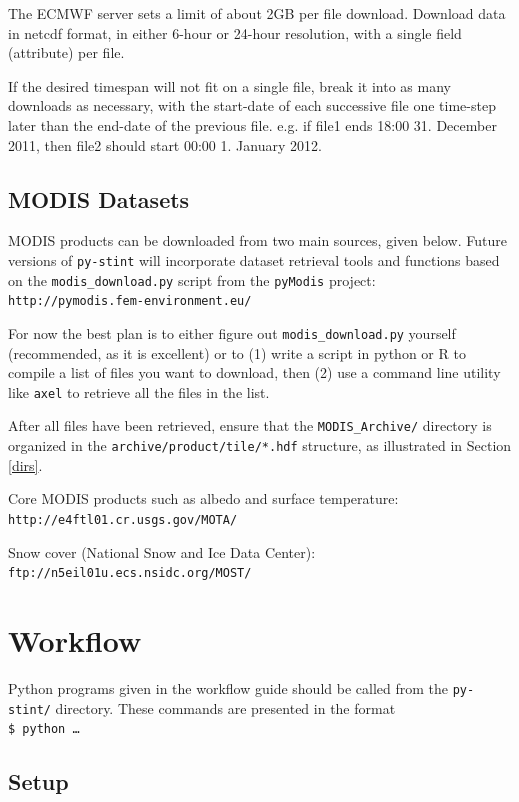 \documentclass[twoside,a4paper]{refart}
\begin{document}
\attention
The ECMWF server sets a limit of about 2GB per file download.  Download data in netcdf format, in either 6-hour or 24-hour resolution, with a single field (attribute) per file. 

If the desired timespan will not fit on a single file, break it into as many downloads as necessary, with the start-date of each successive file one time-step later than the end-date of the previous file. e.g. if file1 ends 18:00 31. December 2011, then file2 should start 00:00 1. January 2012.

\subsection{MODIS Datasets}\label{modis}
MODIS products can be downloaded from two main sources, given below.  Future versions of \texttt{py-stint} will incorporate dataset retrieval tools and functions based on the \texttt{modis\_download.py} script from the \texttt{pyModis} project:
\texttt{http://pymodis.fem-environment.eu/}

For now the best plan is to either figure out \texttt{modis\_download.py} yourself (recommended, as it is excellent) or to (1) write a script in python or R to compile a list of files you want to download, then (2) use a command line utility like \texttt{axel} to retrieve all the files in the list.

After all files have been retrieved, ensure that the \texttt{MODIS\_Archive/} directory is organized in the \texttt{archive/product/tile/*.hdf} structure, as illustrated in Section \ref{dirs}. 

Core MODIS products such as albedo and surface temperature:\\
\texttt{http://e4ftl01.cr.usgs.gov/MOTA/}


Snow cover (National Snow and Ice Data Center):\\
\texttt{ftp://n5eil01u.ecs.nsidc.org/MOST/}

\newpage
\section{Workflow}\label{run}
Python programs given in the workflow guide should be called from the 
\texttt{py-stint/} directory.  These commands are presented in the format \\
\texttt{\$ python \ldots}


\subsection{Setup}
\end{document}
